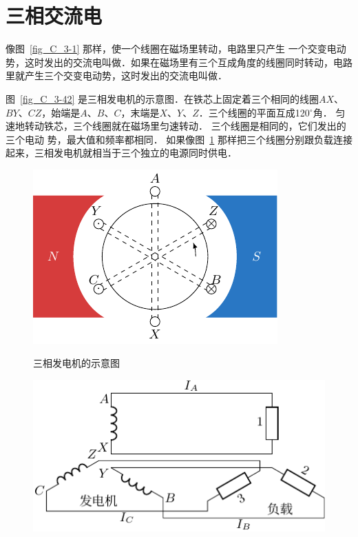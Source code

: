 	
\section{三相交流电}
像图~\ref{fig_C_3-1} 那样，使一个线圈在磁场里转动，电路里只产生
一个交变电动势，这时发出的交流电叫做．如果在磁场里有三个互成角度的线圈同时转动，电路里就产生三个交变电动势，这时发出的交流电叫做．


图~\ref{fig_C_3-42} 是三相发电机的示意图．在铁芯上固定着三个相同的线圈$AX$、$BY$、$CZ$，始端是$A$、$B$、$C$，末端是$X$、$Y$、$Z$．三个线圈的平面互成120$^\circ$角．
匀速地转动铁芯，三个线圈就在磁场里匀速转动．
三个线圈是相同的，它们发出的三个电动
势，最大值和频率都相同．
如果像图~\ref{fig_C_3-43} 那样把三个线圈分别跟负载连接起来，三相发电机就相当于三个独立的电源同时供电．

\begin{figure}[htbp]
	\centering
	\begin{minipage}[b]{0.48\linewidth}
		\centering
		\includegraphics{fig/C/3-42.pdf}
		\caption{三相发电机的示意图}\label{fig_C_3-42}
	\end{minipage}
	\begin{minipage}[b]{0.48\linewidth}
		\centering
		\includegraphics{fig/C/3-43.pdf}
		\caption{}\label{fig_C_3-43}
	\end{minipage}
\end{figure}


